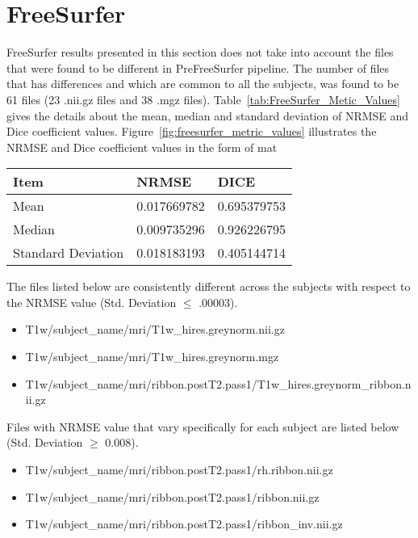 \section{FreeSurfer} \label{sec:Freesurfer}
FreeSurfer results presented in this section does not take into account the files that were found to be different in PreFreeSurfer pipeline. The number of files that has differences and which are common to all the subjects, was found to be 61 files (23 .nii.gz files and 38 .mgz files). Table~\ref{tab:FreeSurfer_Metic_Values} gives the details about the mean, median and standard deviation of NRMSE and Dice coefficient values. Figure~\ref{fig:freesurfer_metric_values} illustrates the NRMSE and Dice coefficient values in the form of mat
\hfill \break
\begin{center}
\begin{tabular}{|l|l|l|}
\hline
Item               & NRMSE       & DICE        \\ \hline
Mean               & 0.017669782 & 0.695379753 \\ \hline
Median             & 0.009735296 & 0.926226795 \\ \hline
Standard Deviation & 0.018183193 & 0.405144714 \\ \hline
\end{tabular}
\label{tab:FreeSurfer_Metic_Values}
\end{center}
\hfill \break
The files listed below are consistently different across the subjects with respect to the NRMSE value (Std. Deviation $\leq$ .00003).
\begin{itemize}
\item T1w/subject\_name/mri/T1w\_hires.greynorm.nii.gz
\item T1w/subject\_name/mri/T1w\_hires.greynorm.mgz
\item T1w/subject\_name/mri/ribbon.postT2.pass1/T1w\_hires.greynorm\_ribbon.nii.gz
\end{itemize}

Files with NRMSE value that vary specifically for each subject are listed below (Std. Deviation $\geq$ 0.008).
\begin{itemize}
\item T1w/subject\_name/mri/ribbon.postT2.pass1/rh.ribbon.nii.gz
\item T1w/subject\_name/mri/ribbon.postT2.pass1/ribbon.nii.gz
\item T1w/subject\_name/mri/ribbon.postT2.pass1/ribbon\_inv.nii.gz
\end{itemize}

